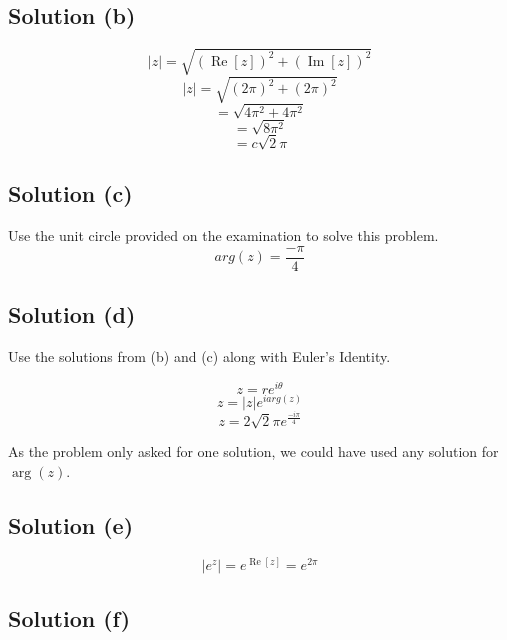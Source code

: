 \documentclass[12pt]{article}
\renewcommand{\Re}{\operatorname{Re}}
\renewcommand{\Im}{\operatorname{Im}}
\begin{document}
\subsection{Solution (b)}
\begin{equation}
	|z|=\sqrt{(\Re[z])^2+(\Im[z])^2}
\end{equation}
\begin{equation}
	|z|=\sqrt{(2\pi)^2+(2\pi)^2}
\end{equation}
\begin{equation}
	=\sqrt{4\pi^2+4\pi^2}
\end{equation}
\begin{equation}
	=\sqrt{8\pi^2}
\end{equation}
\begin{equation}
	=c\sqrt{2}\pi
\end{equation}
\subsection{Solution (c)}
Use the unit circle provided on the examination to solve this problem.
\begin{equation}
	arg(z)=\frac{-\pi}{4}
\end{equation}
\subsection{Solution (d)}
Use the solutions from (b) and (c) along with Euler's Identity.

\begin{equation}
	z=re^{i\theta}
\end{equation}
\begin{equation}
	z=|z|e^{iarg(z)}
\end{equation}
\begin{equation}
	z=2\sqrt{2}\pi e^{\frac{-i\pi}{4}}
\end{equation}

As the problem only asked for one solution, we could have used any solution for $\arg(z)$.
\subsection{Solution (e)}

\begin{equation}
	|e^z|=e^{\Re[z]}=e^{2\pi}
\end{equation}
\subsection{Solution (f)}
\end{document}
